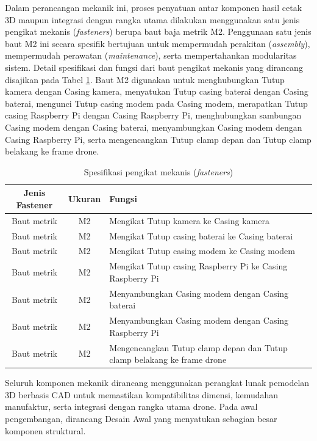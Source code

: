 Dalam perancangan mekanik ini, proses penyatuan antar komponen hasil cetak 3D maupun integrasi dengan rangka utama dilakukan menggunakan satu jenis pengikat mekanis (\textit{fasteners}) berupa baut baja metrik M2. Penggunaan satu jenis baut M2 ini secara spesifik bertujuan untuk mempermudah perakitan (\textit{assembly}), mempermudah perawatan (\textit{maintenance}), serta mempertahankan modularitas sistem. Detail spesifikasi dan fungsi dari baut pengikat mekanis yang dirancang disajikan pada Tabel \ref{tab:fasteners}. Baut M2 digunakan untuk menghubungkan Tutup kamera dengan Casing kamera, menyatukan Tutup casing baterai dengan Casing baterai, mengunci Tutup casing modem pada Casing modem, merapatkan Tutup casing Raspberry Pi dengan Casing Raspberry Pi, menghubungkan sambungan Casing modem dengan Casing baterai, menyambungkan Casing modem dengan Casing Raspberry Pi, serta mengencangkan Tutup clamp depan dan Tutup clamp belakang ke frame drone.
\begin{table}[H]
	\centering
	\caption{Spesifikasi pengikat mekanis (\textit{fasteners})}
	\label{tab:fasteners}
	\renewcommand{\arraystretch}{1.2}
	\begin{tabular}{|c|c|p{8cm}|}
		\hline
		Jenis Fastener & Ukuran & Fungsi \\ \hline
		Baut metrik & M2 & Mengikat Tutup kamera ke Casing kamera \\ \hline
		Baut metrik & M2 & Mengikat Tutup casing baterai ke Casing baterai \\ \hline
		Baut metrik & M2 & Mengikat Tutup casing modem ke Casing modem \\ \hline
		Baut metrik & M2 & Mengikat Tutup casing Raspberry Pi ke Casing Raspberry Pi \\ \hline
		Baut metrik & M2 & Menyambungkan Casing modem dengan Casing baterai \\ \hline
		Baut metrik & M2 & Menyambungkan Casing modem dengan Casing Raspberry Pi \\ \hline
		Baut metrik & M2 & Mengencangkan Tutup clamp depan dan Tutup clamp belakang ke frame drone \\ \hline
	\end{tabular}
\end{table}

Seluruh komponen mekanik dirancang menggunakan perangkat lunak pemodelan 3D berbasis CAD untuk memastikan kompatibilitas dimensi, kemudahan manufaktur, serta integrasi dengan rangka utama drone. Pada awal pengembangan, dirancang Desain Awal yang menyatukan sebagian besar komponen struktural.

